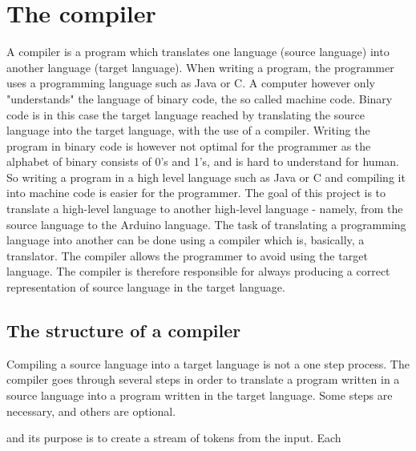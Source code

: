 \chapter{The compiler} \label{chap:the_compiler}
A compiler is a program which translates one language (source language) into another language (target language). When writing a program, the programmer uses a programming language such as Java or C. A computer however only "understands" the language of binary code, the so called machine code. Binary code is in this case the target language reached by translating the source language into the target language, with the use of a compiler. Writing the program in binary code is however not optimal for the programmer as the alphabet of binary consists of 0's and 1's, and is hard to understand for human. So writing a program in a high level language such as Java or C and compiling it into machine code is easier for the programmer.
The goal of this project is to translate a high-level language to another high-level language - namely, from the source language to the Arduino language. The task of translating a programming language into another can be done using a compiler which is, basically, a translator. The compiler allows the programmer to avoid using the target language. The compiler is therefore responsible for always producing a correct representation of source language in the target language.

\section{The structure of a compiler} 
\label{sec:compiler}
Compiling a source language into a target language is not a one step process. The compiler goes through several steps in order to translate a program written in a source language into a program written in the target language. Some steps are necessary, and others are optional.


and its purpose is to create a stream of tokens from the input. Each 


